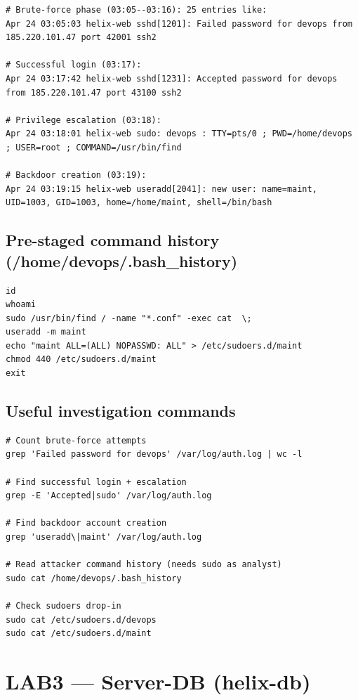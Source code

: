 \begin{lstlisting}
# Brute-force phase (03:05--03:16): 25 entries like:
Apr 24 03:05:03 helix-web sshd[1201]: Failed password for devops from 185.220.101.47 port 42001 ssh2

# Successful login (03:17):
Apr 24 03:17:42 helix-web sshd[1231]: Accepted password for devops from 185.220.101.47 port 43100 ssh2

# Privilege escalation (03:18):
Apr 24 03:18:01 helix-web sudo: devops : TTY=pts/0 ; PWD=/home/devops ; USER=root ; COMMAND=/usr/bin/find

# Backdoor creation (03:19):
Apr 24 03:19:15 helix-web useradd[2041]: new user: name=maint, UID=1003, GID=1003, home=/home/maint, shell=/bin/bash
\end{lstlisting}

\subsection{Pre-staged command history (/home/devops/.bash\_history)}

\begin{lstlisting}
id
whoami
sudo /usr/bin/find / -name "*.conf" -exec cat  \;
useradd -m maint
echo "maint ALL=(ALL) NOPASSWD: ALL" > /etc/sudoers.d/maint
chmod 440 /etc/sudoers.d/maint
exit
\end{lstlisting}

\subsection{Useful investigation commands}

\begin{lstlisting}
# Count brute-force attempts
grep 'Failed password for devops' /var/log/auth.log | wc -l

# Find successful login + escalation
grep -E 'Accepted|sudo' /var/log/auth.log

# Find backdoor account creation
grep 'useradd\|maint' /var/log/auth.log

# Read attacker command history (needs sudo as analyst)
sudo cat /home/devops/.bash_history

# Check sudoers drop-in
sudo cat /etc/sudoers.d/devops
sudo cat /etc/sudoers.d/maint
\end{lstlisting}

\section{LAB3 --- Server-DB (helix-db)}

